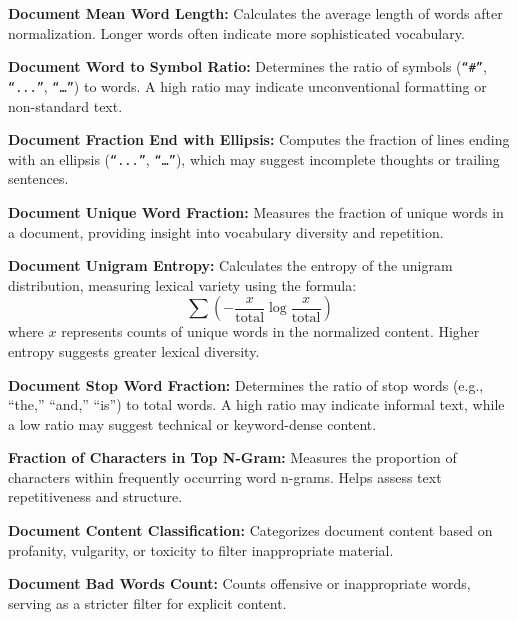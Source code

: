 \noindent \textbf{Document Mean Word Length:}  
Calculates the average length of words after normalization. Longer words often indicate more sophisticated vocabulary.

\noindent \textbf{Document Word to Symbol Ratio:}  
Determines the ratio of symbols (\texttt{``\#''}, \texttt{``...''}, \texttt{``…''}) to words. A high ratio may indicate unconventional formatting or non-standard text.

\noindent \textbf{Document Fraction End with Ellipsis:}  
Computes the fraction of lines ending with an ellipsis (\texttt{``...''}, \texttt{``…''}), which may suggest incomplete thoughts or trailing sentences.

\noindent \textbf{Document Unique Word Fraction:}  
Measures the fraction of unique words in a document, providing insight into vocabulary diversity and repetition.

\noindent \textbf{Document Unigram Entropy:}  
Calculates the entropy of the unigram distribution, measuring lexical variety using the formula:
\[
\sum \left(-\frac{x}{\text{total}} \log \frac{x}{\text{total}}\right)
\]
where \( x \) represents counts of unique words in the normalized content. Higher entropy suggests greater lexical diversity.

\noindent \textbf{Document Stop Word Fraction:}  
Determines the ratio of stop words (e.g., ``the,'' ``and,'' ``is'') to total words. A high ratio may indicate informal text, while a low ratio may suggest technical or keyword-dense content.

\noindent \textbf{Fraction of Characters in Top N-Gram:}  
Measures the proportion of characters within frequently occurring word n-grams. Helps assess text repetitiveness and structure.



\noindent \textbf{Document Content Classification:}  
Categorizes document content based on profanity, vulgarity, or toxicity to filter inappropriate material.

\noindent \textbf{Document Bad Words Count:}  
Counts offensive or inappropriate words, serving as a stricter filter for explicit content.

